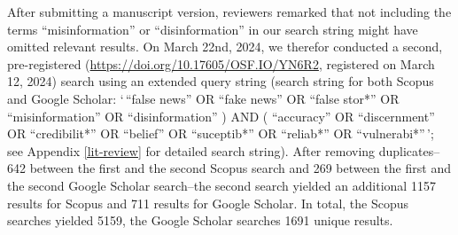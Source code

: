 \documentclass[
  man]{apa6}
\begin{document}
After submitting a manuscript version, reviewers remarked that not including the terms ``misinformation'' or ``disinformation'' in our search string might have omitted relevant results. On March 22nd, 2024, we therefor conducted a second, pre-registered (\url{https://doi.org/10.17605/OSF.IO/YN6R2}, registered on March 12, 2024) search using an extended query string (search string for both Scopus and Google Scholar: `\,``false news'' OR ``fake news'' OR ``false stor*'' OR ``misinformation'' OR ``disinformation'' ) AND ( ``accuracy'' OR ``discernment'' OR ``credibilit*'' OR ``belief'' OR ``suceptib*'' OR ``reliab*'' OR ``vulnerabi*''\,'; see Appendix \ref{lit-review} for detailed search string). After removing duplicates--642 between the first and the second Scopus search and 269 between the first and the second Google Scholar search--the second search yielded an additional 1157 results for Scopus and 711 results for Google Scholar. In total, the Scopus searches yielded 5159, the Google Scholar searches 1691 unique results.
\end{document}
